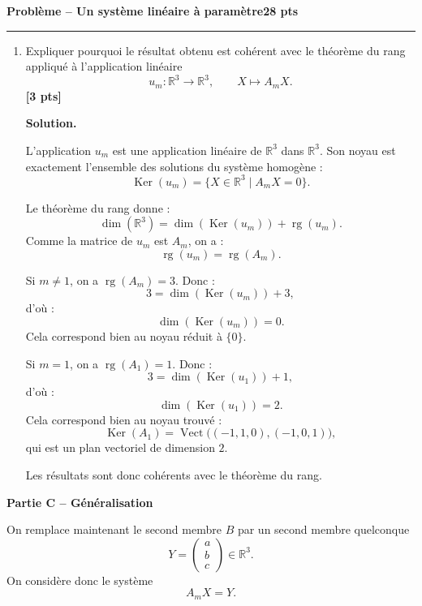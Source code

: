 \documentclass[11pt,a4paper]{article}
\newcommand{\pts}[1]{\hfill \textbf{[#1 pts]}}
\newcommand{\R}{\mathbb{R}}
\newcommand{\Ker}{\operatorname{Ker}}
\newcommand{\rg}{\operatorname{rg}}
\newcommand{\Vect}{\operatorname{Vect}}
\newcounter{probleme}
\newenvironment{probleme}[2]{
    \refstepcounter{probleme}
    \vspace{0.6cm}
    {\Large\color{bleu}\textbf{Problème \theprobleme{} -- #1}}\hfill \textbf{#2 pts}
    \par\medskip
    \hrule
    \medskip
}{\vspace{0.5cm}}
\newcommand{\partie}[1]{
    \vspace{0.35cm}
    {\large\color{gris}\textbf{#1}}
    \par\smallskip
}
\newcommand{\solution}{
    \textbf{\color{bleu}Solution. }
}
\begin{document}
\begin{probleme}{Un système linéaire à paramètre}{28}
\begin{enumerate}[resume]
    Si \(m=1\), le système devient :
    \[
    \begin{cases}
    x+y+z=0,\\
    x+y+z=0,\\
    x+y+z=0.
    \end{cases}
    \]
    Il est donc équivalent à :
    \[
    x+y+z=0.
    \]
    On peut poser \(y=s\) et \(z=t\), avec \(s,t\in\R\). Alors :
    \[
    x=-s-t.
    \]
    Donc :
    \[
    (x,y,z)=(-s-t,s,t)
    =
    s(-1,1,0)+t(-1,0,1).
    \]
    Ainsi :
    \[
    \boxed{
    \Ker(A_1)=
    \Vect\big((-1,1,0),(-1,0,1)\big).}
    \]

    \item Expliquer pourquoi le résultat obtenu est cohérent avec le théorème du rang appliqué à l'application linéaire
    \[
    u_m:\R^3\longrightarrow\R^3,
    \qquad
    X\longmapsto A_mX.
    \]
    \pts{3}

    \solution

    L'application \(u_m\) est une application linéaire de \(\R^3\) dans \(\R^3\). Son noyau est exactement l'ensemble des solutions du système homogène :
    \[
    \Ker(u_m)=\{X\in\R^3\mid A_mX=0\}.
    \]

    Le théorème du rang donne :
    \[
    \dim(\R^3)=\dim(\Ker(u_m))+\rg(u_m).
    \]
    Comme la matrice de \(u_m\) est \(A_m\), on a :
    \[
    \rg(u_m)=\rg(A_m).
    \]

    Si \(m\neq 1\), on a \(\rg(A_m)=3\). Donc :
    \[
    3=\dim(\Ker(u_m))+3,
    \]
    d'où :
    \[
    \dim(\Ker(u_m))=0.
    \]
    Cela correspond bien au noyau réduit à \(\{0\}\).

    Si \(m=1\), on a \(\rg(A_1)=1\). Donc :
    \[
    3=\dim(\Ker(u_1))+1,
    \]
    d'où :
    \[
    \dim(\Ker(u_1))=2.
    \]
    Cela correspond bien au noyau trouvé :
    \[
    \Ker(A_1)=
    \Vect\big((-1,1,0),(-1,0,1)\big),
    \]
    qui est un plan vectoriel de dimension \(2\).

    Les résultats sont donc cohérents avec le théorème du rang.
\end{enumerate}

\partie{Partie C -- Généralisation}

On remplace maintenant le second membre \(B\) par un second membre quelconque
\[
Y=
\begin{pmatrix}
a\\b\\c
\end{pmatrix}
\in\R^3.
\]
On considère donc le système
\[
A_mX=Y.
\]


\end{probleme}
\end{document}
